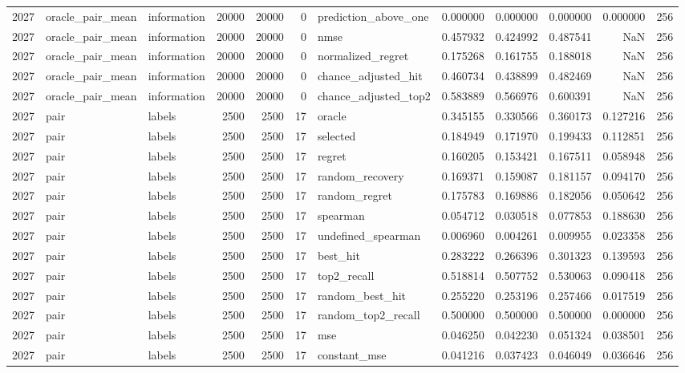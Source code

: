 \begin{tabular}{rllrrrlrrrrr}
2027 & oracle_pair_mean & information & 20000 & 20000 & 0 & prediction_above_one & 0.000000 & 0.000000 & 0.000000 & 0.000000 & 256 \\
2027 & oracle_pair_mean & information & 20000 & 20000 & 0 & nmse & 0.457932 & 0.424992 & 0.487541 & NaN & 256 \\
2027 & oracle_pair_mean & information & 20000 & 20000 & 0 & normalized_regret & 0.175268 & 0.161755 & 0.188018 & NaN & 256 \\
2027 & oracle_pair_mean & information & 20000 & 20000 & 0 & chance_adjusted_hit & 0.460734 & 0.438899 & 0.482469 & NaN & 256 \\
2027 & oracle_pair_mean & information & 20000 & 20000 & 0 & chance_adjusted_top2 & 0.583889 & 0.566976 & 0.600391 & NaN & 256 \\
2027 & pair & labels & 2500 & 2500 & 17 & oracle & 0.345155 & 0.330566 & 0.360173 & 0.127216 & 256 \\
2027 & pair & labels & 2500 & 2500 & 17 & selected & 0.184949 & 0.171970 & 0.199433 & 0.112851 & 256 \\
2027 & pair & labels & 2500 & 2500 & 17 & regret & 0.160205 & 0.153421 & 0.167511 & 0.058948 & 256 \\
2027 & pair & labels & 2500 & 2500 & 17 & random_recovery & 0.169371 & 0.159087 & 0.181157 & 0.094170 & 256 \\
2027 & pair & labels & 2500 & 2500 & 17 & random_regret & 0.175783 & 0.169886 & 0.182056 & 0.050642 & 256 \\
2027 & pair & labels & 2500 & 2500 & 17 & spearman & 0.054712 & 0.030518 & 0.077853 & 0.188630 & 256 \\
2027 & pair & labels & 2500 & 2500 & 17 & undefined_spearman & 0.006960 & 0.004261 & 0.009955 & 0.023358 & 256 \\
2027 & pair & labels & 2500 & 2500 & 17 & best_hit & 0.283222 & 0.266396 & 0.301323 & 0.139593 & 256 \\
2027 & pair & labels & 2500 & 2500 & 17 & top2_recall & 0.518814 & 0.507752 & 0.530063 & 0.090418 & 256 \\
2027 & pair & labels & 2500 & 2500 & 17 & random_best_hit & 0.255220 & 0.253196 & 0.257466 & 0.017519 & 256 \\
2027 & pair & labels & 2500 & 2500 & 17 & random_top2_recall & 0.500000 & 0.500000 & 0.500000 & 0.000000 & 256 \\
2027 & pair & labels & 2500 & 2500 & 17 & mse & 0.046250 & 0.042230 & 0.051324 & 0.038501 & 256 \\
2027 & pair & labels & 2500 & 2500 & 17 & constant_mse & 0.041216 & 0.037423 & 0.046049 & 0.036646 & 256 \\

\end{tabular}
